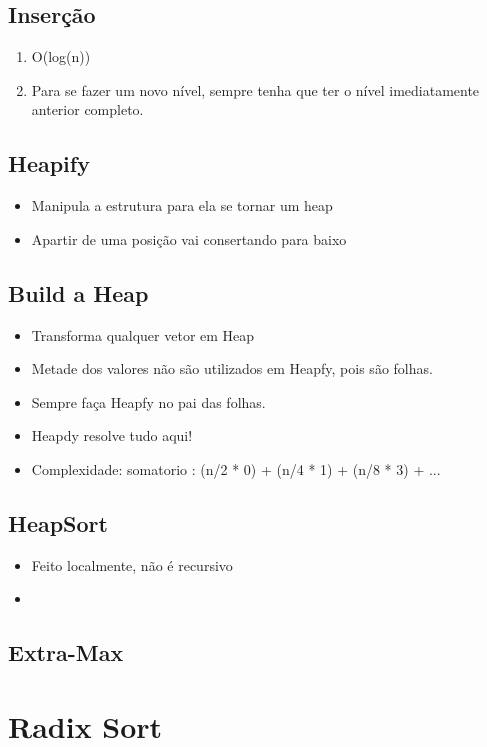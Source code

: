 \documentclass{article}
\begin{document}
\subsection{Inserção}
	\begin{enumerate}
	\item O(log(n))
	\item Para se fazer um novo nível, sempre tenha que ter o nível imediatamente anterior completo.	
	\end{enumerate}
\subsection{Heapify}
	\begin{itemize}
	\item Manipula a estrutura para ela se tornar um heap
	\item Apartir de uma posição vai consertando para baixo
	\end{itemize}
\subsection{Build a Heap}
	\begin{itemize}
	\item Transforma qualquer vetor em Heap
	\item Metade dos valores não são utilizados em Heapfy, pois são folhas.
	\item Sempre faça Heapfy no pai das folhas.
	\item Heapdy resolve tudo aqui!
	\item Complexidade: somatorio : (n/2 * 0) + (n/4 * 1) + (n/8 * 3) + ...
	\end{itemize}
\subsection{HeapSort}
	\begin{itemize}
	\item Feito localmente, não é recursivo
	\item 
	\end{itemize}
\subsection{Extra-Max}

\section{Radix Sort}
\end{document}
